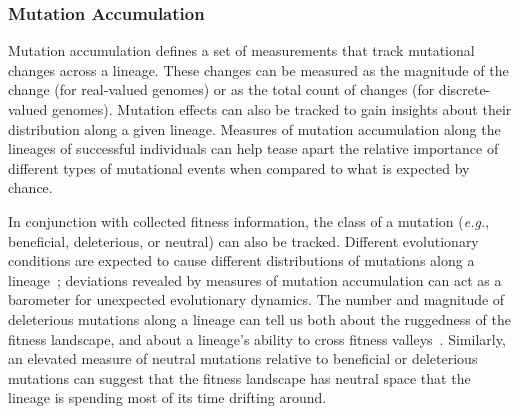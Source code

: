 \documentclass[letterpaper]{article}
\begin{document}
\subsubsection{Mutation Accumulation}
Mutation accumulation defines a set of measurements that track mutational changes across a lineage. These changes can be measured %
as the magnitude of the change (for real-valued genomes) or as the total count of changes (for discrete-valued genomes). Mutation effects can also be tracked to gain insights about their distribution along a given lineage. Measures of mutation accumulation along the lineages of successful individuals can help tease apart the relative importance of different types of mutational events when compared to what is expected by chance. 

In conjunction with collected fitness information, the class of a mutation (\textit{e.g.}, beneficial, deleterious, or neutral) can also be tracked. Different evolutionary conditions are expected to cause different distributions of mutations along a lineage~\citep{barrick2013genome}; deviations revealed by measures of mutation accumulation can act as a barometer for unexpected evolutionary dynamics.  
The number and magnitude of deleterious mutations along a lineage can tell us both about the ruggedness of the fitness landscape, and about a lineage's ability to cross fitness valleys~\citep{covert_experiments_2013}. 
Similarly, an elevated measure of neutral mutations relative to beneficial or deleterious mutations can suggest that the fitness landscape has neutral space that the lineage is spending most of its time drifting around. 


\end{document}
